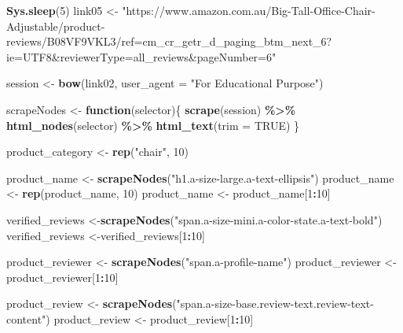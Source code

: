 \documentclass[
]{article}
\newenvironment{Shaded}{\begin{snugshade}}{\end{snugshade}}
\newcommand{\AttributeTok}[1]{\textcolor[rgb]{0.13,0.29,0.53}{#1}}
\newcommand{\ConstantTok}[1]{\textcolor[rgb]{0.56,0.35,0.01}{#1}}
\newcommand{\ControlFlowTok}[1]{\textcolor[rgb]{0.13,0.29,0.53}{\textbf{#1}}}
\newcommand{\DecValTok}[1]{\textcolor[rgb]{0.00,0.00,0.81}{#1}}
\newcommand{\FunctionTok}[1]{\textcolor[rgb]{0.13,0.29,0.53}{\textbf{#1}}}
\newcommand{\NormalTok}[1]{#1}
\newcommand{\OtherTok}[1]{\textcolor[rgb]{0.56,0.35,0.01}{#1}}
\newcommand{\SpecialCharTok}[1]{\textcolor[rgb]{0.81,0.36,0.00}{\textbf{#1}}}
\newcommand{\StringTok}[1]{\textcolor[rgb]{0.31,0.60,0.02}{#1}}
\begin{document}
\begin{Shaded}
\begin{Highlighting}[]
   \FunctionTok{Sys.sleep}\NormalTok{(}\DecValTok{5}\NormalTok{)}
\NormalTok{link05 }\OtherTok{\textless{}{-}} \StringTok{"https://www.amazon.com.au/Big{-}Tall{-}Office{-}Chair{-}Adjustable/product{-}reviews/B08VF9VKL3/ref=cm\_cr\_getr\_d\_paging\_btm\_next\_6?ie=UTF8\&reviewerType=all\_reviews\&pageNumber=6"}


\NormalTok{  session }\OtherTok{\textless{}{-}} \FunctionTok{bow}\NormalTok{(link02,}
               \AttributeTok{user\_agent =} \StringTok{"For Educational Purpose"}\NormalTok{)}

\NormalTok{  scrapeNodes }\OtherTok{\textless{}{-}} \ControlFlowTok{function}\NormalTok{(selector)\{}
    \FunctionTok{scrape}\NormalTok{(session) }\SpecialCharTok{\%\textgreater{}\%}
      \FunctionTok{html\_nodes}\NormalTok{(selector) }\SpecialCharTok{\%\textgreater{}\%}
      \FunctionTok{html\_text}\NormalTok{(}\AttributeTok{trim =} \ConstantTok{TRUE}\NormalTok{)}
\NormalTok{  \}}

\NormalTok{  product\_category }\OtherTok{\textless{}{-}} \FunctionTok{rep}\NormalTok{(}\StringTok{"chair"}\NormalTok{, }\DecValTok{10}\NormalTok{)}

\NormalTok{  product\_name }\OtherTok{\textless{}{-}} \FunctionTok{scrapeNodes}\NormalTok{(}\StringTok{"h1.a{-}size{-}large.a{-}text{-}ellipsis"}\NormalTok{)}
\NormalTok{  product\_name }\OtherTok{\textless{}{-}} \FunctionTok{rep}\NormalTok{(product\_name, }\DecValTok{10}\NormalTok{)}
\NormalTok{  product\_name }\OtherTok{\textless{}{-}}\NormalTok{ product\_name[}\DecValTok{1}\SpecialCharTok{:}\DecValTok{10}\NormalTok{]}
  
\NormalTok{  verified\_reviews }\OtherTok{\textless{}{-}}\FunctionTok{scrapeNodes}\NormalTok{(}\StringTok{"span.a{-}size{-}mini.a{-}color{-}state.a{-}text{-}bold"}\NormalTok{)}
\NormalTok{  verified\_reviews }\OtherTok{\textless{}{-}}\NormalTok{verified\_reviews[}\DecValTok{1}\SpecialCharTok{:}\DecValTok{10}\NormalTok{]}
  
\NormalTok{  product\_reviewer }\OtherTok{\textless{}{-}} \FunctionTok{scrapeNodes}\NormalTok{(}\StringTok{"span.a{-}profile{-}name"}\NormalTok{)}
\NormalTok{  product\_reviewer }\OtherTok{\textless{}{-}}\NormalTok{ product\_reviewer[}\DecValTok{1}\SpecialCharTok{:}\DecValTok{10}\NormalTok{]}
  
\NormalTok{  product\_review }\OtherTok{\textless{}{-}} \FunctionTok{scrapeNodes}\NormalTok{(}\StringTok{"span.a{-}size{-}base.review{-}text.review{-}text{-}content"}\NormalTok{)}
\NormalTok{  product\_review }\OtherTok{\textless{}{-}}\NormalTok{ product\_review[}\DecValTok{1}\SpecialCharTok{:}\DecValTok{10}\NormalTok{]}
  

\end{Highlighting}
\end{Shaded}
\end{document}
